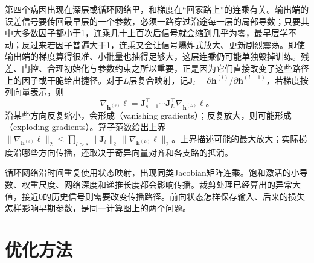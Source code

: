 第四个病因出现在深层或循环网络里，和梯度在“回家路上”的连乘有关。输出端的误差信号要传回最早层的一个参数，必须一路穿过沿途每一层的局部导数；只要其中大多数因子都小于1，连乘几十上百次后信号就会缩到几乎为零，最早层学不动；反过来若因子普遍大于1，连乘又会让信号爆炸式放大、更新剧烈震荡。即使输出端的梯度算得很准、小批量也抽得足够大，这层连乘仍可能单独毁掉训练。残差、门控、合理初始化与参数约束之所以重要，正是因为它们直接改变了这些路径上的因子或干脆给出捷径。对于$L$层复合映射，记$\bm J_l=\partial\bm h^{(l)}/\partial\bm h^{(l-1)}$，若梯度按列向量表示，则
\begin{equation}
  \nabla_{\bm h^{(s)}}\ell
  =\bm J_{s+1}^{\top}\cdots\bm J_L^{\top}
    \nabla_{\bm h^{(L)}}\ell\text{。}
  \label{eq:training-jacobian-chain}
\end{equation}
沿某些方向反复缩小，会形成（vanishing gradients）；反复放大，则可能形成（exploding gradients）。算子范数给出上界$\lVert\nabla_{\bm h^{(s)}}\ell\rVert_2\leq\prod_{l>s}\lVert\bm J_l\rVert_2\,\lVert\nabla_{\bm h^{(L)}}\ell\rVert_2$。上界描述可能的最大放大；实际梯度沿哪些方向传播，还取决于奇异向量对齐和各支路的抵消。

循环网络沿时间重复使用状态映射，出现同类Jacobian矩阵连乘。饱和激活的小导数、权重尺度、网络深度和递推长度都会影响传播。裁剪处理已经算出的异常大值，接近0的历史信号则需要改变传播路径。前向状态怎样保存输入、后来的损失怎样影响早期参数，是同一计算图上的两个问题。

\section{优化方法}
\label{sec:training-optimizers}

